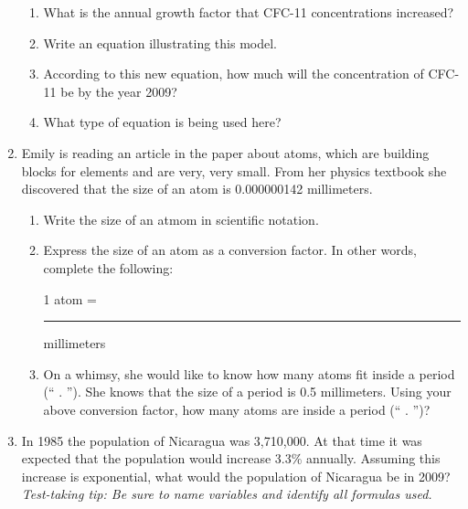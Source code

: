 \documentclass[12pt]{article}
\begin{document}
\begin{enumerate}
\begin{enumerate}
\item What is the annual growth factor that CFC-11 concentrations increased?  
\vfill
\item Write an equation illustrating this model.
\vfill
\item According to this new equation, how much will the concentration of CFC-11 be by the year 2009?
\vfill
\item What type of equation is being used here?
\vfill
\end{enumerate}



\newpage


\item  Emily is reading an article in the paper about atoms, which are building blocks for elements and are very, very small.  From her physics textbook she discovered that the size of an atom is 0.000000142 millimeters.  

\begin{enumerate}
\item Write the size of an atmom in scientific notation.
\vfill
\item Express the size of an atom as a conversion factor.  In other words, complete the following:
\vspace{0.2in}
\begin{center} 1 atom = \rule{1.5in}{.01in} millimeters \end{center}
\vspace{0.2in}

\item On a whimsy, she would like to know how many atoms fit inside a period (`` . '').  She knows that the size of a period is 0.5 millimeters.  Using your above conversion factor, how many atoms are inside a period (`` . '')?
\vfill



\end{enumerate}


\item In 1985 the population of Nicaragua was 3,710,000. At that time it was expected that the population would increase 3.3\% annually.  Assuming this increase is exponential, what would the population of Nicaragua be in 2009?  \emph{Test-taking tip: Be sure to name variables and identify all formulas used.}


\vfill



\end{enumerate}
\end{document}
